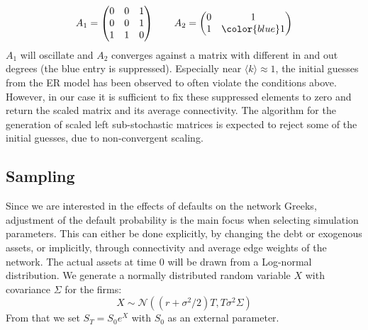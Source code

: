 \documentclass{article}
\begin{document}
%
\begin{equation*}
    A_1 = 
\begin{pmatrix}
0 & 0 & 1 \\
0 & 0 & 1 \\
1 & 1 & 0
\end{pmatrix}
\qquad 
A_2 = 
\begin{pmatrix}
0 & 1 \\
1 & {\color{blue}1}
\end{pmatrix}
\end{equation*}
%
$A_1$ will oscillate and $A_2$ converges against a matrix with different in and out degrees (the blue entry is suppressed).
%
Especially near $\langle k \rangle \approx 1$, the initial guesses from the ER model has been observed to often violate the conditions above. 
However, in our case it is sufficient to fix these suppressed elements to zero and return the scaled matrix and its average connectivity.
The algorithm for the generation of scaled left sub-stochastic matrices is expected to reject some of the initial guesses, due to non-convergent scaling.



\subsection{Sampling}
Since we are interested in the effects of defaults on the network Greeks, adjustment of the default probability is the main focus when selecting simulation parameters.
This can either be done explicitly, by changing the debt or exogenous assets, or implicitly, through connectivity and average edge weights of the network.
The actual assets at time $0$ will be drawn from a Log-normal distribution.
We generate a normally distributed random variable $X$ with covariance $\Sigma$ for the firms:
%
\begin{equation}
  X \sim \mathcal{N} \left( (r + \sigma^2/2)T , T \sigma^2 \Sigma \right)  
\end{equation}
%
From that we set $S_T = S_0 e^{X}$ with $S_0$ as an external parameter. 


\clearpage
\end{document}
